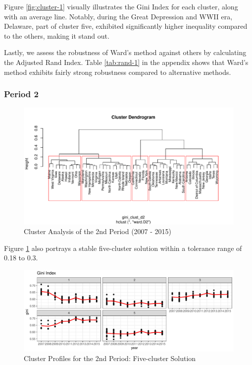 \documentclass[11pt,a4paper,]{article}
\begin{document}
Figure \ref{fig:cluster-1} visually illustrates the Gini Index for each cluster, along with an average line. Notably, during the Great Depression and WWII era, Delaware, part of cluster five, exhibited significantly higher inequality compared to the others, making it stand out.

Lastly, we assess the robustness of Ward's method against others by calculating the Adjusted Rand Index. Table \ref{tab:rand-1} in the appendix shows that Ward's method exhibits fairly strong robustness compared to alternative methods.

\newpage

\hypertarget{period-2}{%
\subsubsection{Period 2}\label{period-2}}

\begin{figure}

{\centering \includegraphics{Assignment_2_ETF5500_files/figure-latex/clust-2-dendrogram-1} 

}

\caption{Cluster Analysis of the 2nd Period (2007 - 2015)}\label{fig:clust-2-dendrogram}
\end{figure}

Figure \ref{fig:clust-2-dendrogram} also portrays a stable five-cluster solution within a tolerance range of 0.18 to 0.3.

\begin{figure}
\centering
\includegraphics{Assignment_2_ETF5500_files/figure-latex/cluster-2-1.pdf}
\caption{\label{fig:cluster-2}Cluster Profiles for the 2nd Period: Five-cluster Solution}
\end{figure}
\end{document}
